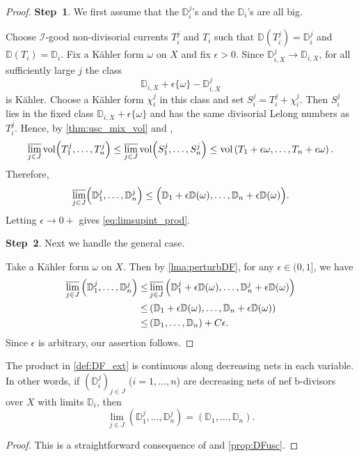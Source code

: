 \begin{proof}
    \textbf{Step~1}. We first assume that the $\mathbb D_i^j$'s and the $\mathbb D_i$'s are all big.

    Choose $\mathcal I$-good non-divisorial currents $T_i^j$ and $T_i$ such that $\mathbb D(T_i^j)=\mathbb D_i^j$ and $\mathbb D(T_i)=\mathbb D_i$. Fix a Kähler form $\omega$ on $X$ and fix $\epsilon>0$. Since $\mathbb D_{i,X}^j\to\mathbb D_{i,X}$, for all sufficiently large $j$ the class
    \[
        \mathbb D_{i,X}+\epsilon\{\omega\}-\mathbb D_{i,X}^j
    \]
    is Kähler. Choose a Kähler form $\chi_i^j$ in this class and set $S_i^j=T_i^j+\chi_i^j$. Then $S_i^j$ lies in the fixed class $\mathbb D_{i,X}+\epsilon\{\omega\}$ and has the same divisorial Lelong numbers as $T_i^j$. Hence, by \cref{thm:usc_mix_vol} and ,
    \[
        \varlimsup_{j\in J}\operatorname{vol}\Bigl(T_1^j,\ldots,T_n^j\Bigr)\leq \varlimsup_{j\in J}\operatorname{vol}\Bigl(S_1^j,\ldots,S_n^j\Bigr)\leq\operatorname{vol}\left(T_1+\epsilon\omega,\ldots,T_n+\epsilon\omega\right).
    \]
    Therefore,
    \[
        \varlimsup_{j\in J}\Bigl(\mathbb D_1^j,\ldots,\mathbb D_n^j\Bigr)\leq \Bigl(\mathbb D_1+\epsilon\mathbb D(\omega),\ldots,\mathbb D_n+\epsilon\mathbb D(\omega)\Bigr).
    \]
    Letting $\epsilon\to 0+$ gives \eqref{eq:limsupint_prod}.

    \textbf{Step~2}. Next we handle the general case.

    Take a Kähler form $\omega$ on $X$. Then by \cref{lma:perturbDF}, for any $\epsilon\in (0,1]$, we have
    \[
    \begin{aligned}
          \varlimsup_{j\in J}\left(\mathbb{D}_1^j,\ldots,\mathbb{D}_n^j \right)
        \leq & \varlimsup_{j\in J}\left(\mathbb{D}_1^j+\epsilon \mathbb{D}(\omega),\ldots,\mathbb{D}_n^j+\epsilon \mathbb{D}(\omega) \right)\\
        \leq & \left( \mathbb{D}_1+\epsilon \mathbb{D}(\omega),\ldots,\mathbb{D}_n+\epsilon \mathbb{D}(\omega) \right)\\
        \leq & \left( \mathbb{D}_1,\ldots,\mathbb{D}_n \right)+C\epsilon.
    \end{aligned}
    \]
    Since $\epsilon$ is arbitrary, our assertion follows.
\end{proof}

\begin{proposition}\label{prop:DFdecnet}
    The product in \cref{def:DF_ext} is continuous along decreasing nets in each variable. In other words, if $(\mathbb{D}_i^j)_{j\in J}$ ($i=1,\ldots,n$) are decreasing nets of nef b-divisors over $X$ with limits $\mathbb{D}_i$, then
    \[
    \lim_{j\in J} \left(\mathbb{D}_1^j,\ldots,\mathbb{D}_n^j\right)=\left(\mathbb{D}_1,\ldots,\mathbb{D}_n\right).
    \]
\end{proposition}
\begin{proof}
    This is a straightforward consequence of  and \cref{prop:DFusc}.
\end{proof}

